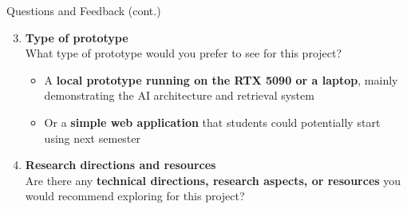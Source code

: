 \begin{frame}{Questions and Feedback (cont.)}
\begin{enumerate}
    \setcounter{enumi}{2}

    \item \textbf{Type of prototype} \\
    What type of prototype would you prefer to see for this project?
    \begin{itemize}
        \item A \textbf{local prototype running on the RTX 5090 or a laptop}, mainly demonstrating the AI architecture and retrieval system
        \item Or a \textbf{simple web application} that students could potentially start using next semester
    \end{itemize}

    \item \textbf{Research directions and resources} \\
    Are there any \textbf{technical directions, research aspects, or resources} you would recommend exploring for this project?
\end{enumerate}
\end{frame}